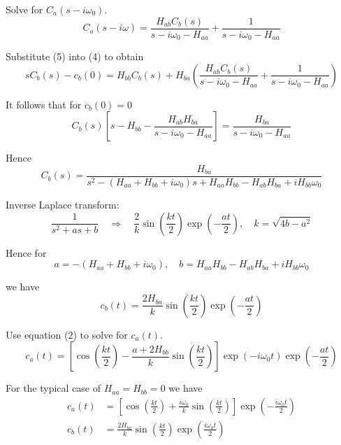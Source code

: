 Solve for $C_a(s-i\omega_0)$.
\begin{equation*}
C_a(s-i\omega)=\frac{H_{ab}C_b(s)}{s-i\omega_0-H_{aa}}+\frac{1}{s-i\omega_0-H_{aa}}
\tag{5}
\end{equation*}

Substitute (5) into (4) to obtain
\begin{equation*}
sC_b(s)-c_b(0)=H_{bb}C_b(s)+H_{ba}
\left(
\frac{H_{ab}C_b(s)}{s-i\omega_0-H_{aa}}+\frac{1}{s-i\omega_0-H_{aa}}
\right)
\end{equation*}

It follows that for $c_b(0)=0$
\begin{equation*}
C_b(s)\left[s-H_{bb}-\frac{H_{ab}H_{ba}}{s-i\omega_0-H_{aa}}\right]=\frac{H_{ba}}{s-i\omega_0-H_{aa}}
\end{equation*}

Hence
\begin{equation*}
C_b(s)=\frac{H_{ba}}{s^2-(H_{aa}+H_{bb}+i\omega_0)s+H_{aa}H_{bb}-H_{ab}H_{ba}+iH_{bb}\omega_0}
\end{equation*}

Inverse Laplace transform:
\begin{equation*}
\frac{1}{s^2+as+b}\quad\Rightarrow\quad
\frac{2}{k}\sin\left(\frac{kt}{2}\right)\exp\left(-\frac{at}{2}\right),\quad
k=\sqrt{4b-a^2}
\end{equation*}

Hence for
\begin{equation*}
a=-(H_{aa}+H_{bb}+i\omega_0),\quad
b=H_{aa}H_{bb}-H_{ab}H_{ba}+iH_{bb}\omega_0
\end{equation*}

we have
\begin{equation*}
c_b(t)=\frac{2H_{ba}}{k}
\sin\left(\frac{kt}{2}\right)
\exp\left(-\frac{at}{2}\right)
\end{equation*}

Use equation (2) to solve for $c_a(t)$.
\begin{equation*}
c_a(t)=\left[
\cos\left(\frac{kt}{2}\right)-\frac{a+2H_{bb}}{k}\sin\left(\frac{kt}{2}\right)
\right]\exp(-i\omega_0t)\exp\left(-\frac{at}{2}\right)
\end{equation*}

For the typical case of $H_{aa}=H_{bb}=0$ we have
\begin{align*}
c_a(t)&=\left[\cos\left(\frac{kt}{2}\right)+\frac{i\omega_0}{k}\sin\left(\frac{kt}{2}\right)\right]
\exp\left(-\frac{i\omega_0t}{2}\right)
\tag{6}
\\[1ex]
c_b(t)&=\frac{2H_{ba}}{k}\sin\left(\frac{kt}{2}\right)\exp\left(\frac{i\omega_0t}{2}\right)
\tag{7}
\end{align*}


